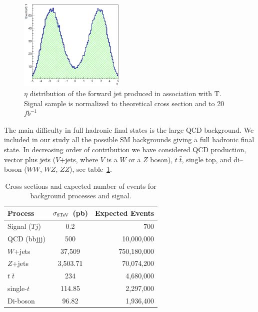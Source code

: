 \begin{figure}[!Hhtbp]
  \begin{center}
    \includegraphics[width=0.45\textwidth]{figs/Pheno/SixthJet.png}
    \caption{$\eta$ distribution of the forward jet produced in association with T. Signal sample is normalized to theoretical cross section and to 20 $fb^{-1}$}
    \label{fig:ForwJ}
  \end{center}
\end{figure}

The main difficulty in full hadronic final states is the large QCD background. We included in our study all the possible SM backgrounds giving a full hadronic final state. In decreasing order of contribution we have considered QCD production, vector plus jets ($V$+jets, where $V$ is a $W$ or a $Z$ boson), $t\; \bar{t}$, single top, and di--boson ($WW$, $WZ$, $ZZ$), see table~\ref{tab:xsec}. 

\begin{table}[htbH]
\label{tab:xsec}
\begin{center}
\begin{tabular}{||l|c|r||}
  \hline\hline
  Process & $\sigma_{\rm 8 TeV}$ (pb) & Expected Events \\ \hline
 Signal ($Tj$) & 0.2 & 700 \\
 \hline
  QCD (bbjjj) & 500 & 10,000,000 \\
  $W$+jets & 37,509 & 750,180,000 \\
  $Z$+jets & 3,503.71 & 70,074,200 \\ 
  $t\; \bar{t}$ & 234 & 4,680,000 \\
  single-$t$ & 114.85 & 2,297,000 \\
  Di-boson & 96.82 & 1,936,400 \\
  \hline\hline
\end{tabular}
\caption{Cross sections and expected number of events for background processes and signal.}
\end{center}
\end{table}

